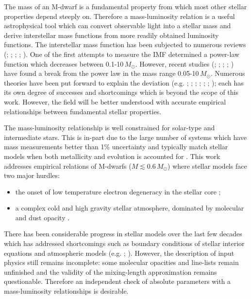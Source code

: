 The mass of an M-dwarf is a fundamental property from which most other stellar properties depend steeply on. Therefore a mass-luminosity relation is a useful astrophysical tool which can convert observable light into a stellar mass and derive interstellar mass functions from more readily obtained luminosity functions. The interstellar mass function has been subjected to numerous reviews (\citealt{2010ARA&A..48..339B}; \citealt{2012EAS....57...45J}; \citealt{2013pss5.book..115K}; \citealt{2014prpl.conf...53O}; \citealt{2017ApJ...841...68V}). One of the first attempts to measure the IMF determined a power-law function which decreases between 0.1-10\,$M_\odot$. However, recent studies (\citealt{2000ApJ...544.1044L};  \citealt{2000ApJ...540.1016L};  \citealt{2014prpl.conf...53O}; \citealt{2003PASP..115..763C}; \citealt{2006ApJ...640L..63L}) have found a break from the power law in the mass range 0.05-10\,$M_\odot$. Numerous theories have been put forward to explain the deviation (e.g. \citealt{1992MNRAS.256..641L}; \citealt{2005MNRAS.356.1201B}; \citealt{2012MNRAS.423.3601N}; \citealt{2001BpJ....81.2020G}; \citealt{2007PASJ...59..589O}; \citealt{2013A&A...557A..90V}; \citealt{2010ApJ...709..308M}); each has its own degree of successes and shortcomings which is beyond the scope of this work. However, the field will be better understood with accurate empirical relationships between fundamental stellar properties. 

The mass-luminosity relationship is well constrained for solar-type and intermediate stars. This is in-part due to the large number of systems which have mass measurements better than 1\% uncertainty \citep{1991A&ARv...3...91A} and typically match stellar models when both metallicity and evolution is accounted for \citep{1997IAUS..189.....B}. This work addresses empirical relations of M-dwarfs ($M \lesssim 0.6\, M_\odot$) where stellar models face two major hurdles:
%
\begin{itemize}
    \item the onset of low temperature electron degeneracy in the stellar core  \citep{2000ApJ...542..464C};
    \item a complex cold and high gravity stellar atmosphere, dominated by molecular and dust opacity \citep{1998ASPC..134..370A}.
\end{itemize}
%
There has been considerable progress in stellar models over the last few decades which has addressed shortcomings such as boundary conditions of stellar interior equations and atmospheric models  (e.g. \citealt{2016ApJ...823..102C}; \citealt{2007A&A...472L..17C}). However, the description of input physics still remains incomplete: some molecular opacities and line-lists remain unfinished and the validity of the mixing-length approximation remains questionable. Therefore an independent check of absolute parameters with a mass-luminosity relationships is desirable.


